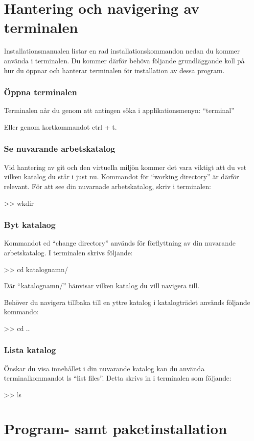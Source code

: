 \documentclass{TDP003mall}
\begin{document}
\section*{Hantering och navigering av terminalen}
Installationsmanualen listar en rad installationskommandon nedan du kommer använda i terminalen. Du kommer därför behöva följande grundläggande koll på hur du öppnar och hanterar terminalen för installation av dessa program.

\subsubsection*{Öppna terminalen}
Terminalen når du genom att antingen söka i applikationsmenyn: ``terminal''

Eller genom kortkommandot ctrl + t.

\subsubsection*{Se nuvarande arbetskatalog}
Vid hantering av git och den virtuella miljön kommer det vara viktigt att du vet vilken katalog du står i just nu.
Kommandot för ``working directory'' är därför relevant. För att see din nuvarnade arbetskatalog, skriv i terminalen:

>> wkdir

\subsubsection*{Byt katalaog}
Kommandot cd ``change directory'' används för förflyttning av din nuvarande arbetskatalog. I terminalen skrivs följande:

>> cd katalognamn/

Där ``katalognamn/'' hänvisar vilken katalog du vill navigera till.

Behöver du navigera tillbaka till en yttre katalog i katalogträdet används följande kommando:

>> cd ..

\subsubsection*{Lista katalog}
Önskar du visa innehållet i din nuvarande katalog kan du använda terminalkommandot ls ``list files''. Detta skrivs in i
terminalen som följande:

>> ls

\section*{Program- samt paketinstallation}
\end{document}
